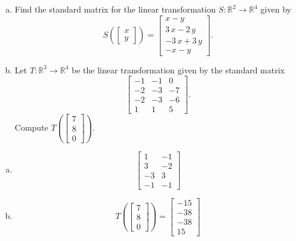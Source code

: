 
\begin{exerciseStatement}

\begin{enumerate}[(a)]
\item Find the standard matrix for the linear transformation \(S:\mathbb{R}^ 2  \to \mathbb{R}^ 4 \) given by \[S\left(  \left[\begin{array}{c}
x \\
y
\end{array}\right]  \right) =  \left[\begin{array}{c}
x - y \\
3 \, x - 2 \, y \\
-3 \, x + 3 \, y \\
-x - y
\end{array}\right] .\]
\item Let \(T:\mathbb{R}^ 3  \to \mathbb{R}^ 4 \) be the linear transformation given by the standard matrix \[ \left[\begin{array}{ccc}
-1 & -1 & 0 \\
-2 & -3 & -7 \\
-2 & -3 & -6 \\
1 & 1 & 5
\end{array}\right] .\] Compute \(T\left( \left[\begin{array}{c}
7 \\
8 \\
0
\end{array}\right]  \right)\). 
\end{enumerate}
    
\end{exerciseStatement}
    
\begin{exerciseAnswer} 

\begin{enumerate}[(a)]
\item \[ \left[\begin{array}{cc}
1 & -1 \\
3 & -2 \\
-3 & 3 \\
-1 & -1
\end{array}\right] \]
\item \[T\left( \left[\begin{array}{c}
7 \\
8 \\
0
\end{array}\right]  \right)= \left[\begin{array}{c}
-15 \\
-38 \\
-38 \\
15
\end{array}\right] \]
\end{enumerate}
    
\end{exerciseAnswer}
    
